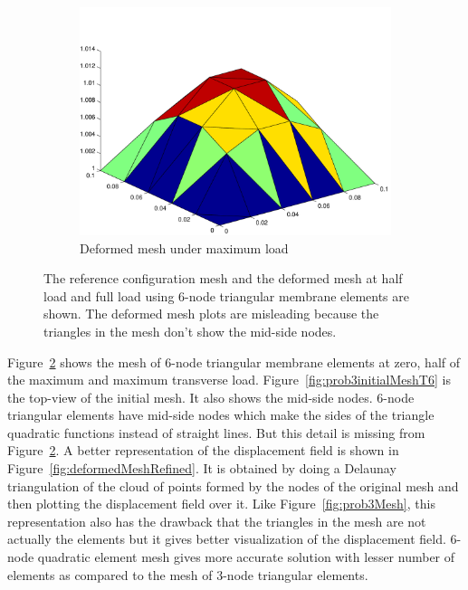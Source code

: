 \documentclass[../main.tex]{subfiles}
\begin{document}
\begin{figure}[ht]
\begin{subfigure}[b]{0.3\textwidth}
    \includegraphics[scale=0.3]{./img/deformedMeshT6.pdf}
    \caption{Deformed mesh under maximum load}
    \label{fig:prob3DeformedMeshT6}
  \end{subfigure}
  \caption{The reference configuration mesh and the deformed mesh at
    half load and full load using 6-node triangular membrane elements
    are shown. The deformed mesh plots are misleading because the
    triangles in the mesh don't show the mid-side nodes.}
  \label{fig:prob3MeshT6}
\end{figure}
Figure~\ref{fig:prob3MeshT6} shows the mesh of 6-node triangular
membrane elements at zero, half of the maximum and maximum transverse
load. Figure~\ref{fig:prob3initialMeshT6} is the top-view of the
initial mesh. It also shows the mid-side nodes. 6-node triangular
elements have mid-side nodes which make the sides of the triangle
quadratic functions instead of straight lines. But this detail is
missing from Figure~\ref{fig:prob3MeshT6}. A better representation of
the displacement field is shown in
Figure~\ref{fig:deformedMeshRefined}. It is obtained by doing a
Delaunay triangulation of the cloud of points formed by the nodes of
the original mesh and then plotting the displacement field over
it. Like Figure~\ref{fig:prob3Mesh}, this representation also has the
drawback that the triangles in the mesh are not actually the elements
but it gives better visualization of the displacement field. 6-node
quadratic element mesh gives more accurate solution with lesser number
of elements as compared to the mesh of 3-node triangular elements.
\end{document}
